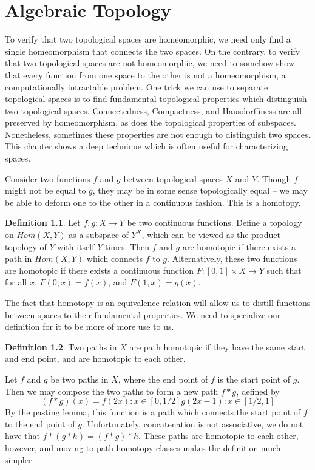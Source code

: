 \documentclass{report}
\theoremstyle{plain}
\theoremstyle{definition}
\newtheorem*{defi}{Definition}
\newenvironment{definition}
    {\begin{samepage}\begin{framed}\begin{defi}}
    {\end{defi}\end{framed}\end{samepage}}
\begin{document}
\chapter{Algebraic Topology}

To verify that two topological spaces are homeomorphic, we need only find a single homeomorphism that connects the two spaces. On the contrary, to verify that two topological spaces are not homeomorphic, we need to somehow show that every function from one space to the other is not a homeomorphism, a computationally intractable problem. One trick we can use to separate topological spaces is to find fundamental topological properties which distinguish two topological spaces. Connectedness, Compactness, and Hausdorffiness are all preserved by homeomorphism, as does the topological properties of subspaces. Nonetheless, sometimes these properties are not enough to distinguish two spaces. This chapter shows a deep technique which is often useful for characterizing spaces.

Consider two functions $f$ and $g$ between topological spaces $X$ and $Y$. Though $f$ might not be equal to $g$, they may be in some sense topologically equal -- we may be able to deform one to the other in a continuous fashion. This is a homotopy.

\begin{definition}
    Let $f,g: X \to Y$ be two continuous functions. Define a topology on $Hom(X,Y)$ as a subspace of $Y^X$, which can be viewed as the product topology of $Y$ with itself $Y$ times. Then $f$ and $g$ are homotopic if there exists a path in $Hom(X,Y)$ which connects $f$ to $g$. Alternatively, these two functions are homotopic if there exists a continuous function $F:[0,1] \times X \to Y$ such that for all $x$, $F(0,x) = f(x)$, and $F(1,x) = g(x)$.
\end{definition}

The fact that homotopy is an equivalence relation will allow us to distill functions between spaces to their fundamental properties. We need to specialize our definition for it to be more of more use to us.

\begin{definition}
    Two paths in $X$ are path homotopic if they have the same start and end point, and are homotopic to each other.
\end{definition}

Let $f$ and $g$ be two paths in $X$, where the end point of $f$ is the start point of $g$. Then we may compose the two paths to form a new path $f * g$, defined by
%
\[ (f * g)(x) = f(2x): x \in [0,1/2]
                g(2x - 1): x \in [1/2,1] \]
%
By the pasting lemma, this function is a path which connects the start point of $f$ to the end point of $g$. Unfortunately, concatenation is not associative, we do not have that $f * (g * h) = (f * g) * h$. These paths are homotopic to each other, however, and moving to path homotopy classes makes the definition much simpler.
\end{document}
